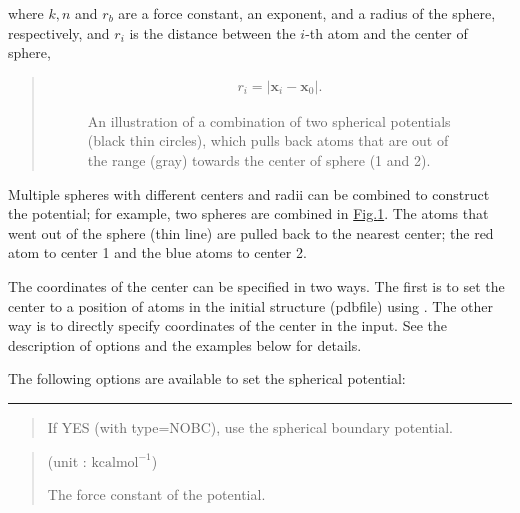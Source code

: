 \documentclass[a4paper,11pt,oneside,english]{sphinxmanual}
\begin{document}
where \(k, n\) and \(r_b\) are a force constant, an exponent, and
a radius of the sphere, respectively, and \(r_i\) is the distance
between the \(i\)-th atom and the center of sphere,
\begin{quote}
\begin{equation*}
\begin{split}r_i = | \mathbf{x}_i - \mathbf{x}_0 | .\end{split}
\end{equation*}
\begin{figure}[htbp]
\centering
\capstart

\noindent{}
\caption{An illustration of a combination of two spherical potentials (black thin circles),
which pulls back atoms that are out of the range (gray) towards the center of
sphere (1 and 2).}\label{\detokenize{10_Boundary:fig10-1}}\end{figure}
\end{quote}

Multiple spheres with different centers and radii can be combined to construct
the potential; for example, two spheres are combined in \hyperref[\detokenize{10_Boundary:fig10-1}]{Fig.\@ \ref{\detokenize{10_Boundary:fig10-1}}}. The
atoms that went out of the sphere (thin line) are pulled back to the nearest
center; the red atom to center 1 and the blue atoms to center 2.

The coordinates of the center can be specified in two ways. The first is
to set the center to a position of atoms in the initial structure (pdbfile)
using \sphinxstylestrong{{[}SELECTOR{]}}.  The other way is to directly specify coordinates of the
center in the input. See the description of options and the examples below for details.

The following options are available to set the spherical potential:


\bigskip\hrule\bigskip


 
\begin{quote}


If YES (with type=NOBC), use the spherical boundary potential.
\end{quote}

 
\begin{quote}

 (unit : \(\mathrm{kcal mol}^{-1}\))

The force constant of the potential.
\end{quote}
\end{document}
